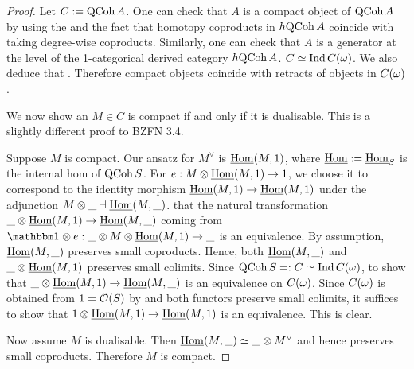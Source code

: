 \documentclass[./main.tex]{subfiles}
\begin{document}
\begin{proof}

  Let $C := \mathrm{QCoh}\,A$.
  One can check that $A$ is a compact object of $\mathrm{QCoh}\,A$ by
  using the  and the fact that
  homotopy coproducts in $h\mathrm{QCoh}\,A$ coincide with
  taking degree-wise coproducts.
  Similarly, one can check that $A$ is a generator
  at the level of the 1-categorical derived category $h\mathrm{QCoh}\,A$.
   $C \simeq \mathrm{Ind}\,C(\omega)$.
  We also deduce that .
  Therefore compact objects coincide with retracts of objects in $C(\omega)$.

  We now show an $M \in C$ is compact if and only if it is dualisable.
  This is a slightly different proof to BZFN 3.4.

  Suppose $M$ is compact.
  Our ansatz for $M^\vee$ is $\underline{\mathrm{Hom}}(M,1)$,
  where $\underline{\mathrm{Hom}} := \underline{\mathrm{Hom}}_S$ is the internal hom of
  $\mathrm{QCoh}\,S$.
  For $e : M \otimes \underline{\mathrm{Hom}}(M,1) \to 1$,
  we choose it to correspond to the identity morphism 
  $\underline{\mathrm{Hom}}(M,1) \to \underline{\mathrm{Hom}}(M,1)$ under the adjunction
  $M\otimes \_ \dashv \underline{\mathrm{Hom}}(M , \_)$.
  that the natural transformation 
  $\_ \otimes \underline{\mathrm{Hom}}(M , 1) \to \underline{\mathrm{Hom}}(M , \_)$
  coming from 
  $\id{} \otimes e : \_ \otimes M \otimes \underline{\HOM}(M , 1) \to \_$
  is an equivalence.
  By assumption, $\underline{\mathrm{Hom}}(M , \_)$ preserves small coproducts.
  {Hence}, both $\underline{\mathrm{Hom}}(M , \_)$ and 
  $\_ \otimes \underline{\mathrm{Hom}}(M , 1)$ preserves small colimits.
  Since $\mathrm{QCoh}\,S =: C \simeq \mathrm{Ind}\,C(\omega)$,
   to show that
  $\_ \otimes \underline{\mathrm{Hom}}(M , 1) \to \underline{\mathrm{Hom}}(M , \_)$
  is an equivalence on $C(\omega)$.
  Since $C(\omega)$ is obtained from $1 = \mathcal{O}(S)$ by 
   and 
  both functors preserve small colimits, it suffices to show that
  $1 \otimes \underline{\mathrm{Hom}}(M , 1) \to \underline{\mathrm{Hom}}(M , 1)$
  is an equivalence.
  This is clear.

  Now assume $M$ is dualisable.
  Then $\underline{\mathrm{Hom}}(M , \_) \simeq \_ \otimes M^\vee$
  and hence preserves small coproducts.
  Therefore $M$ is compact.

\end{proof}
\end{document}
